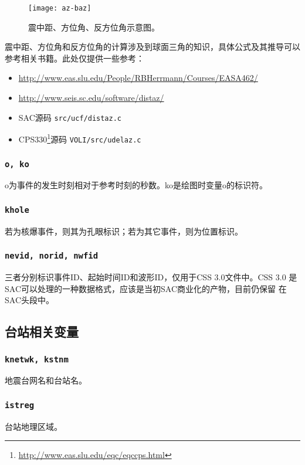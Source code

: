\begin{figure}[H]
\centering
\texttt{[image: az-baz]}
\caption[震中距、方位角、反方位角示意图]{震中距、方位角、反方位角示意图。}
\label{fig:gcarc-dist-az-baz}
\end{figure}

震中距、方位角和反方位角的计算涉及到球面三角的知识，具体公式及其推导可以参考相关书籍。此处仅提供一些参考：

\begin{itemize}
\item \url{http://www.eas.slu.edu/People/RBHerrmann/Courses/EASA462/}
\item \url{http://www.seis.sc.edu/software/distaz/}
\item SAC源码 \texttt{src/ucf/distaz.c}
\item CPS330\footnote{\url{http://www.eas.slu.edu/eqc/eqccps.html}}源码 \texttt{VOLI/src/udelaz.c}
\end{itemize}

\subsubsection{\texttt{o, ko}}
o为事件的发生时刻相对于参考时刻的秒数。ko是绘图时变量o的标识符。

\subsubsection{\texttt{khole}}
若为核爆事件，则其为孔眼标识；若为其它事件，则为位置标识。

\subsubsection{\texttt{nevid, norid, nwfid}}
三者分别标识事件ID、起始时间ID和波形ID，仅用于CSS 3.0文件中。CSS 3.0
是SAC可以处理的一种数据格式，应该是当初SAC商业化的产物，目前仍保留
在SAC头段中。

\subsection{台站相关变量}
\subsubsection{\texttt{knetwk, kstnm}}
地震台网名和台站名。

\subsubsection{\texttt{istreg}\dag}
台站地理区域。

